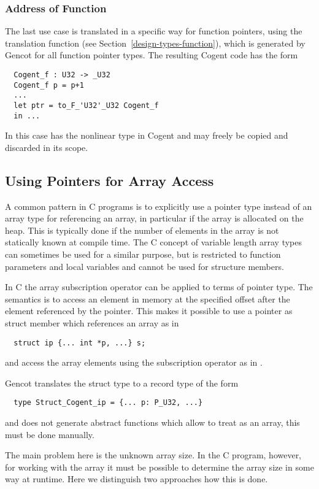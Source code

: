 \subsubsection{Address of Function}

The last use case is translated in a specific way for function pointers, using the translation function
 (see Section~\ref{design-types-function}), which is generated by Gencot for all function
pointer types. The resulting Cogent code has the form
\begin{verbatim}
  Cogent_f : U32 -> _U32
  Cogent_f p = p+1
  ...
  let ptr = to_F_'U32'_U32 Cogent_f
  in ...
\end{verbatim}
In this case  has the nonlinear type  in Cogent and may freely be copied and
discarded in its scope.

\subsection{Using Pointers for Array Access}
\label{app-trans-arrpoint}

A common pattern in C programs is to explicitly use a pointer type instead of an array type for referencing an array,
in particular if the array is allocated on the heap. This is typically done if the number of elements in the
array is not statically known at compile time. The C concept of variable length array types can sometimes be
used for a similar purpose, but is restricted to function parameters and local variables and cannot be used for
structure members.

In C the array subscription operator can be applied to terms of pointer type. The semantics is to access an element 
in memory at the specified offset after the element referenced by the pointer. This makes it possible to use 
a pointer as struct member which references an array as in
\begin{verbatim}
  struct ip {... int *p, ...} s;
\end{verbatim}
and access the array elements using the subscription operator as in .

Gencot translates the struct type to a record type of the form
\begin{verbatim}
  type Struct_Cogent_ip = {... p: P_U32, ...}
\end{verbatim}
and does not generate abstract functions which allow to treat  as an array, this must be done manually.

The main problem here is the unknown array size. In the C program, however, for working with the array it must be
possible to determine the array size in some way at runtime. Here we distinguish two approaches how this is done.

